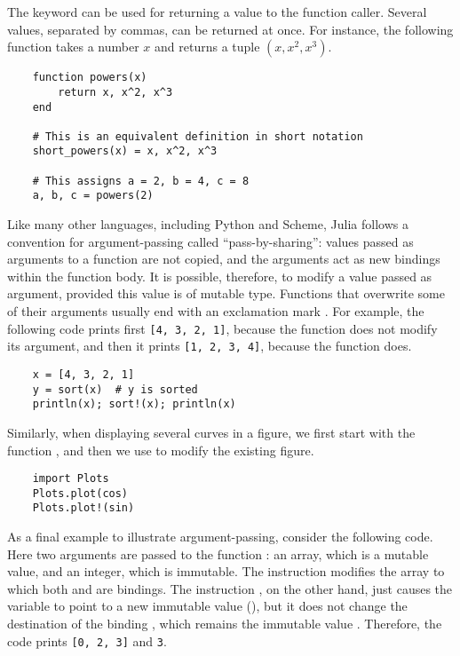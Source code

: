 The  keyword can be used for returning a value to the function caller.
Several values, separated by commas, can be returned at once.
For instance, the following function takes a number $x$ and returns a tuple $(x, x^2, x^3)$.
\begin{verbatim}
    function powers(x)
        return x, x^2, x^3
    end

    # This is an equivalent definition in short notation
    short_powers(x) = x, x^2, x^3

    # This assigns a = 2, b = 4, c = 8
    a, b, c = powers(2)
\end{verbatim}

Like many other languages,
including Python and Scheme,
Julia follows a convention for argument-passing called ``pass-by-sharing'':
values passed as arguments to a function are not copied,
and the arguments act as new bindings within the function body.
It is possible, therefore, to modify a value passed as argument,
provided this value is of mutable type.
Functions that overwrite some of their arguments usually end with an exclamation mark \julia{!}.
For example, the following code prints first \texttt{[4, 3, 2, 1]},
because the function  does not modify its argument,
and then it prints \texttt{[1, 2, 3, 4]},
because the function  does.
\begin{verbatim}
    x = [4, 3, 2, 1]
    y = sort(x)  # y is sorted
    println(x); sort!(x); println(x)
\end{verbatim}
Similarly,
when displaying several curves in a figure,
we first start with the function ,
and then we use  to modify the existing figure.
\begin{verbatim}
    import Plots
    Plots.plot(cos)
    Plots.plot!(sin)
\end{verbatim}

As a final example to illustrate argument-passing,
consider the following code.
Here two arguments are passed to the function :
an array, which is a mutable value,
and an integer, which is immutable.
The instruction  modifies the array to which both  and  are bindings.
The instruction ,
on the other hand, just causes the variable  to point to a new immutable value (),
but it does not change the destination of the binding , which remains the immutable value .
Therefore, the code prints \texttt{[0, 2, 3]} and \texttt{3}.

